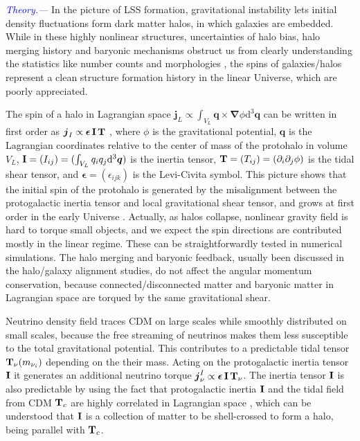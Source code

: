 \documentclass[aps,prd,twocolumn,amsmath,amssymb,amsfont,superscriptaddress]{revtex4-1}
\newcommand{\bs}{\boldsymbol}
\newcommand{\diff}{{\mathrm d}}
\newcommand{\tcb}{\textcolor{blue}}
\begin{document}
\tcb{\textit{Theory.---}} 
In the picture of LSS formation, gravitational instability lets initial density fluctuations form dark matter halos, in which galaxies are embedded. While in these highly nonlinear structures, uncertainties of halo bias, halo merging history and baryonic mechanisms obstruct us from clearly understanding the statistics like number counts and morphologies \citep{2018MNRAS.tmp.2447C}, the spins of galaxies/halos represent a clean structure formation history in the linear Universe, which are poorly appreciated. 

The spin of a halo in Lagrangian space $\bs{j}_L\propto\int_{V_L}\bs{q}\times\bs{\nabla}\phi\diff^3\bs{q}$ can be written in first order as $\bs{j}_I\propto\bs{\epsilon}\,\bold{I}\,\bold{T}$ \citep{1984ApJ...286...38W}, where $\phi$ is the gravitational potential, $\bs{q}$ is the Lagrangian coordinates relative to the center of mass of the protohalo in volume $V_L$, $\bold{I}=(I_{ij})=(\int_{V_L} q_i q_j \diff^3\bs{q})$ is the inertia tensor, $\bold{T}=(T_{ij})=(\partial_i\partial_j\phi)$ is the tidal shear tensor, and $\bs{\epsilon}=(\epsilon_{ijk})$ is the Levi-Civita symbol. This picture shows that the initial spin of the protohalo is generated by the misalignment between the protogalactic inertia tensor and local gravitational shear tensor, and grows at first order in the early Universe \citep{1984ApJ...286...38W}. Actually, as halos collapse, nonlinear gravity field is hard to torque small objects, and we expect the spin directions are contributed mostly in the linear regime. These can be straightforwardly tested in numerical simulations. The halo merging and baryonic feedback, usually been discussed in the halo/galaxy alignment studies, do not affect the angular momentum conservation, because connected/disconnected matter and baryonic matter in Lagrangian space are torqued by the same gravitational shear.

Neutrino density field traces CDM on large scales while smoothly distributed on small scales, because the free streaming of neutrinos makes them less susceptible to the total gravitational potential. This contributes to a predictable tidal tensor $\bold{T}_\nu(m_{\nu_i})$ depending on the their mass. Acting on the protogalactic inertia tensor $\bold{I}$ it generates an additional neutrino torque $\bs{j}^I_\nu\propto\bs{\epsilon}\,\bold{I}\,\bold{T}_\nu$. The inertia tensor $\bold{I}$ is also predictable by using the fact that protogalactic inertia $\bold{I}$ and the tidal field from CDM $\bold{T}_c$ are highly correlated in Lagrangian space \citep{2000ApJ...532L...5L,2001ApJ...555..106L}, which can be understood that $\bold{I}$ is a collection of matter to be shell-crossed to form a halo, being parallel with $\bold{T}_c$.
\end{document}
